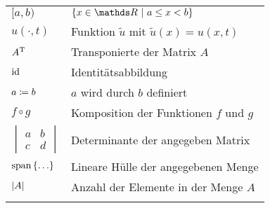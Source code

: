 \documentclass[crop=false,10pt,ngerman]{standalone}
\begin{document}
\begin{table}[H]
\begin{tabularx}{\textwidth}{p{}p{}}
      $[a,b)$ & $\set{x\in\setReal}{a\leq x < b}$ \\
      $u(\cdot,t)$ & Funktion $\tilde{u}$ mit $\tilde{u}(x) = u(x,t)$ \\
      ${A}^{\mathrm{T}}$ & Transponierte der Matrix $A$ \\
      $\mathrm{id}$ & Identitätsabbildung \\
      $a\coloneqq b$ & $a$ wird durch $b$ definiert \\
      $f\circ g$ & Komposition der Funktionen $f$ und $g$ \\
      $\begin{vmatrix} a & b \\ c & d \end{vmatrix}$ & Determinante der angegeben Matrix \\
      $\mathrm{span}\set{\ldots}{}$ & Lineare Hülle der angegebenen Menge \\
      $\left| A \right|$ & Anzahl der Elemente in der Menge $A$ \\
      \\
      \hline
    \end{tabularx}
  \end{table}
\end{document}
